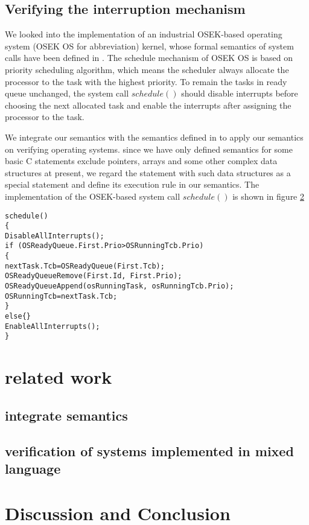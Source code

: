 \documentclass[conference]{IEEEtran}
\begin{document}
\subsection{Verifying the interruption mechanism}
\par We looked into the implementation of an industrial OSEK-based operating system (OSEK OS for abbreviation) kernel, whose formal semantics of system calls have been defined in \cite{}. The schedule mechanism of OSEK OS is based on priority scheduling algorithm, which means the scheduler always allocate the processor to the task with the highest priority. To remain the tasks in ready queue unchanged, the system call $schedule()$ should disable interrupts before choosing the next allocated task and enable the interrupts after assigning the processor to the task.
\par We integrate our semantics with the semantics defined in \cite{} to apply our semantics on verifying operating systems. since we have only defined semantics for some basic C statements exclude pointers, arrays and some other complex data structures at present, we regard the statement with such data structures as a special statement and define its execution rule in our semantics. The implementation of the OSEK-based system call $schedule()$ is shown in figure \ref{}
\begin{lstlisting}[xleftmargin=1em]
schedule()
{
DisableAllInterrupts();
if (OSReadyQueue.First.Prio>OSRunningTcb.Prio)
{
nextTask.Tcb=OSReadyQueue(First.Tcb);
OSReadyQueueRemove(First.Id, First.Prio);
OSReadyQueueAppend(osRunningTask, osRunningTcb.Prio);
OSRunningTcb=nextTask.Tcb;
}
else{}
EnableAllInterrupts();
}
\end{lstlisting}	
\section{related work}
\subsection{integrate semantics}
\subsection{verification of systems implemented in mixed language}
\section{Discussion and Conclusion}
\end{document}
